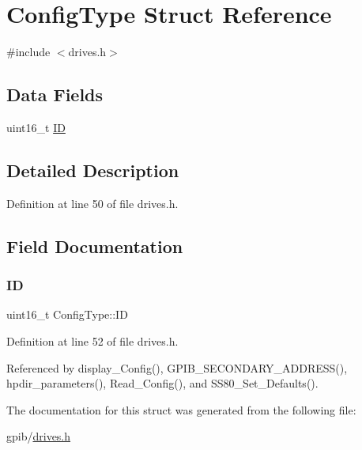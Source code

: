 \hypertarget{structConfigType}{}\section{Config\+Type Struct Reference}
\label{structConfigType}


{\ttfamily \#include $<$drives.\+h$>$}

\subsection*{Data Fields}
\begin{DoxyCompactItemize}
\item 
uint16\+\_\+t \hyperlink{structConfigType_a7d89346361dc0f06db0917c7ff37501a}{ID}
\end{DoxyCompactItemize}


\subsection{Detailed Description}


Definition at line 50 of file drives.\+h.



\subsection{Field Documentation}
\mbox{\label{structConfigType_a7d89346361dc0f06db0917c7ff37501a}} 
\subsubsection{\texorpdfstring{ID}{ID}}
{\footnotesize\ttfamily uint16\+\_\+t Config\+Type\+::\+ID}



Definition at line 52 of file drives.\+h.



Referenced by display\+\_\+\+Config(), G\+P\+I\+B\+\_\+\+S\+E\+C\+O\+N\+D\+A\+R\+Y\+\_\+\+A\+D\+D\+R\+E\+S\+S(), hpdir\+\_\+parameters(), Read\+\_\+\+Config(), and S\+S80\+\_\+\+Set\+\_\+\+Defaults().



The documentation for this struct was generated from the following file\+:\begin{DoxyCompactItemize}
\item 
gpib/\hyperlink{drives_8h}{drives.\+h}\end{DoxyCompactItemize}
